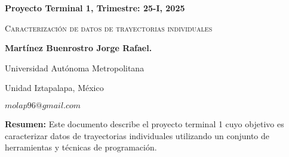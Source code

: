 \documentclass[letterpaper,11pt,twoside]{report}
\date{}
\begin{document}
    \centerline{\bf Proyecto Terminal 1, Trimestre: 25-I, 2025}
    \centerline{}
    \centerline{}
    \begin{center}
    \Large{\textsc{Caracterización de datos de trayectorias individuales}}
    \end{center}
    \centerline{}
    \centerline{\bf {Martínez Buenrostro Jorge Rafael.}}
    \centerline{}
    \centerline{Universidad Aut\'onoma Metropolitana}
    \centerline{Unidad Iztapalapa, M\'exico}
    \centerline{$molap96@gmail.com$}
    \newtheorem{Theorem}{\quad Theorem}[section]
    \newtheorem{Definition}[Theorem]{\quad Definition}
    \newtheorem{Corollary}[Theorem]{\quad Corollary}
    \newtheorem{Lemma}[Theorem]{\quad Lemma}
    \newtheorem{Example}[Theorem]{\quad Example}
    \bigskip
    \textbf{Resumen:}  Este documento describe el proyecto terminal 1 cuyo objetivo es caracterizar datos de trayectorias individuales utilizando un conjunto de herramientas y técnicas de programación. 
	

	

    \newpage
    
\end{document}
